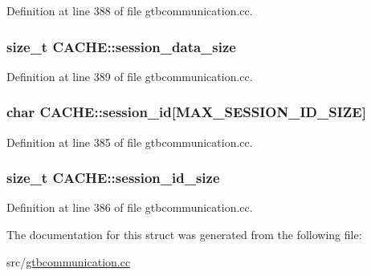 Definition at line 388 of file gtbcommunication.\-cc.

\hypertarget{structCACHE_ab8dfd4baa14b034eaedad34115ad06f5}{
\subsubsection[{session\-\_\-data\-\_\-size}]{\setlength{\rightskip}{0pt plus 5cm}size\-\_\-t C\-A\-C\-H\-E\-::session\-\_\-data\-\_\-size}}\label{structCACHE_ab8dfd4baa14b034eaedad34115ad06f5}


Definition at line 389 of file gtbcommunication.\-cc.

\hypertarget{structCACHE_a546945d83f3c1401f06d1cfdf5107689}{
\subsubsection[{session\-\_\-id}]{\setlength{\rightskip}{0pt plus 5cm}char C\-A\-C\-H\-E\-::session\-\_\-id\mbox{[}{\bf M\-A\-X\-\_\-\-S\-E\-S\-S\-I\-O\-N\-\_\-\-I\-D\-\_\-\-S\-I\-Z\-E}\mbox{]}}}\label{structCACHE_a546945d83f3c1401f06d1cfdf5107689}


Definition at line 385 of file gtbcommunication.\-cc.

\hypertarget{structCACHE_ad06d74c3164389ccc45261443bafc460}{
\subsubsection[{session\-\_\-id\-\_\-size}]{\setlength{\rightskip}{0pt plus 5cm}size\-\_\-t C\-A\-C\-H\-E\-::session\-\_\-id\-\_\-size}}\label{structCACHE_ad06d74c3164389ccc45261443bafc460}


Definition at line 386 of file gtbcommunication.\-cc.



The documentation for this struct was generated from the following file\-:\begin{DoxyCompactItemize}
\item 
src/\hyperlink{gtbcommunication_8cc}{gtbcommunication.\-cc}\end{DoxyCompactItemize}
